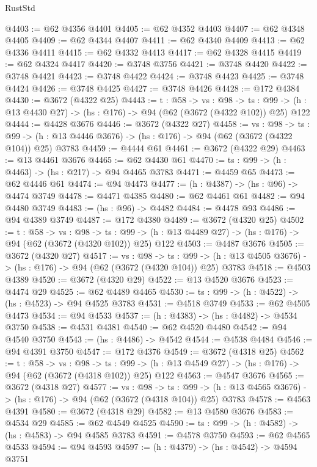 \begin{lexlean}{RustStd}
\begin{coremodule}
@4403 := @62 @4356 @4401
@4405 := @62 @4352 @4403
@4407 := @62 @4348 @4405
@4409 := @62 @4344 @4407
@4411 := @62 @4340 @4409
@4413 := @62 @4336 @4411
@4415 := @62 @4332 @4413
@4417 := @62 @4328 @4415
@4419 := @62 @4324 @4417
@4420 := @3748 @3756
@4421 := @3748 @4420
@4422 := @3748 @4421
@4423 := @3748 @4422
@4424 := @3748 @4423
@4425 := @3748 @4424
@4426 := @3748 @4425
@4427 := @3748 @4426
@4428 := @172 @4384
@4430 := @3672 (@4322 @25)
@4443 := {t : @58} ->
  {vs : @98} ->
  {ts : @99} -> (h : @13 @4430 @27) -> (hs : @176) -> @94 (@62 (@3672 (@4322 @102)) @25) @122
@4444 := @4428 @3676
@4446 := @3672 (@4322 @27)
@4458 := {vs : @98} ->
  {ts : @99} -> (h : @13 @4446 @3676) -> (hs : @176) -> @94 (@62 (@3672 (@4322 @104)) @25) @3783
@4459 := @4444 @61
@4461 := @3672 (@4322 @29)
@4463 := @13 @4461 @3676
@4465 := @62 @4430 @61
@4470 := {ts : @99} -> (h : @4463) -> (hs : @217) -> @94 @4465 @3783
@4471 := @4459 @65
@4473 := @62 @4446 @61
@4474 := @94 @4473
@4477 := (h : @4387) -> (hs : @96) -> @4474 @3749
@4478 := @4471 @4385
@4480 := @62 @4461 @61
@4482 := @94 @4480 @3749
@4483 := (hs : @96) -> @4482
@4484 := @4478 @93
@4486 := @94 @4389 @3749
@4487 := @172 @4380
@4489 := @3672 (@4320 @25)
@4502 := {t : @58} ->
  {vs : @98} ->
  {ts : @99} -> (h : @13 @4489 @27) -> (hs : @176) -> @94 (@62 (@3672 (@4320 @102)) @25) @122
@4503 := @4487 @3676
@4505 := @3672 (@4320 @27)
@4517 := {vs : @98} ->
  {ts : @99} -> (h : @13 @4505 @3676) -> (hs : @176) -> @94 (@62 (@3672 (@4320 @104)) @25) @3783
@4518 := @4503 @4389
@4520 := @3672 (@4320 @29)
@4522 := @13 @4520 @3676
@4523 := @4474 @29
@4525 := @62 @4489 @4465
@4530 := {ts : @99} -> (h : @4522) -> (hs : @4523) -> @94 @4525 @3783
@4531 := @4518 @3749
@4533 := @62 @4505 @4473
@4534 := @94 @4533
@4537 := (h : @4383) -> (hs : @4482) -> @4534 @3750
@4538 := @4531 @4381
@4540 := @62 @4520 @4480
@4542 := @94 @4540 @3750
@4543 := (hs : @4486) -> @4542
@4544 := @4538 @4484
@4546 := @94 @4391 @3750
@4547 := @172 @4376
@4549 := @3672 (@4318 @25)
@4562 := {t : @58} ->
  {vs : @98} ->
  {ts : @99} -> (h : @13 @4549 @27) -> (hs : @176) -> @94 (@62 (@3672 (@4318 @102)) @25) @122
@4563 := @4547 @3676
@4565 := @3672 (@4318 @27)
@4577 := {vs : @98} ->
  {ts : @99} -> (h : @13 @4565 @3676) -> (hs : @176) -> @94 (@62 (@3672 (@4318 @104)) @25) @3783
@4578 := @4563 @4391
@4580 := @3672 (@4318 @29)
@4582 := @13 @4580 @3676
@4583 := @4534 @29
@4585 := @62 @4549 @4525
@4590 := {ts : @99} -> (h : @4582) -> (hs : @4583) -> @94 @4585 @3783
@4591 := @4578 @3750
@4593 := @62 @4565 @4533
@4594 := @94 @4593
@4597 := (h : @4379) -> (hs : @4542) -> @4594 @3751

\end{coremodule}
\end{lexlean}
